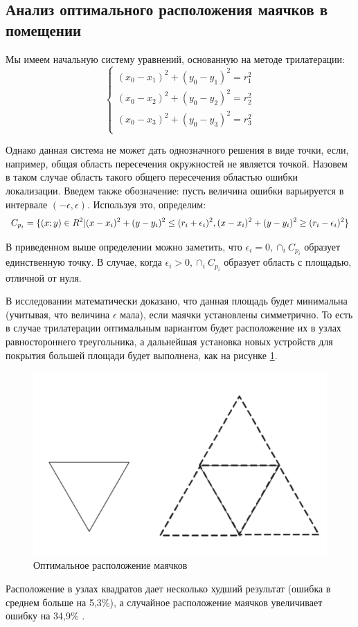 \subsection{Анализ оптимального расположения маячков в помещении}

Мы имеем начальную систему уравнений, основанную на методе трилатерации:
\[
\begin{cases}
    (x_0-x_1)^2+(y_0-y_1)^2=r_1^2 \\
    (x_0-x_2)^2+(y_0-y_2)^2=r_2^2 \\
    (x_0-x_3)^2+(y_0-y_3)^2=r_3^2 \\
\end{cases}
\]

Однако данная система не может дать однозначного решения в виде точки, если, например, общая область пересечения окружностей не является точкой. Назовем в таком случае область такого общего пересечения областью ошибки локализации. Введем также обозначение: пусть величина ошибки варьируется в интервале $(-\epsilon, \epsilon)$. Используя это, определим:
\[
C_{p_i}=
    \{ 
        (x; y) \in R^2 | (x-x_i)^2+(y-y_i)^2 \leq (r_i+\epsilon_i)^2, \\
                                             (x-x_i)^2+(y-y_i)^2 \geq (r_i-\epsilon_i)^2 
    \}
\]

В приведенном выше определении можно заметить, что $\epsilon_i=0, \cap_i C_{p_i}$ образует единственную точку. В случае, когда $\epsilon_i>0, \cap_i C_{p_i}$ образует область с площадью, отличной от нуля.

В исследовании \cite{han2009reference} математически доказано, что данная площадь будет минимальна (учитывая, что величина $\epsilon$ мала), если маячки установлены симметрично. То есть в случае трилатерации оптимальным вариантом будет расположение их в узлах равностороннего треугольника, а дальнейшая установка новых устройств для покрытия большей площади будет выполнена, как на рисунке \ref{optimum_placement}.

\begin{figure}[ht]
    \centering
    \includegraphics[scale=0.6]{img/triangles}
    \caption{Оптимальное расположение маячков}
    \label{optimum_placement}
\end{figure}

Расположение в узлах квадратов дает несколько худший результат (ошибка в среднем больше на 5,3\%), а случайное расположение маячков увеличивает ошибку на 34,9\% \cite{bulusu2001adaptive}.
